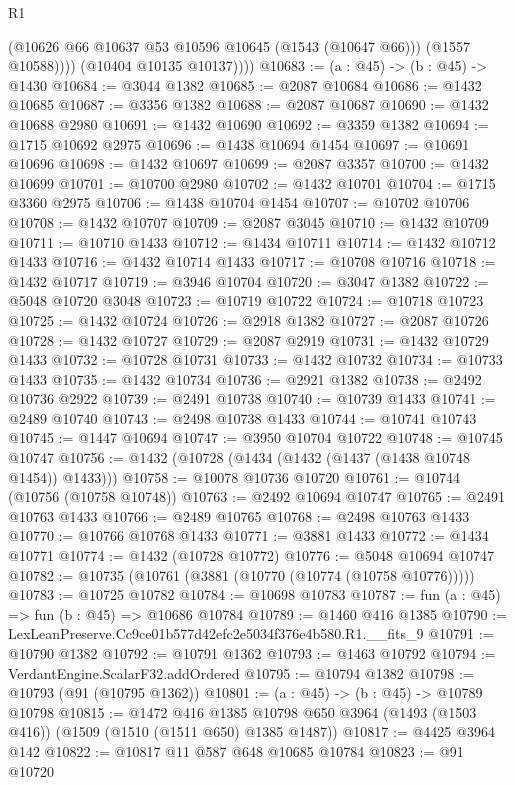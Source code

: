 \begin{lexlean}{R1}
\begin{coremodule}
                (@10626 @66 @10637 @53 @10596 @10645 (@1543 (@10647 @66)))
                (@1557 @10588))))
          (@10404 @10135 @10137))))
@10683 := (a : @45) -> (b : @45) -> @1430
@10684 := @3044 @1382
@10685 := @2087 @10684
@10686 := @1432 @10685
@10687 := @3356 @1382
@10688 := @2087 @10687
@10690 := @1432 @10688 @2980
@10691 := @1432 @10690
@10692 := @3359 @1382
@10694 := @1715 @10692 @2975
@10696 := @1438 @10694 @1454
@10697 := @10691 @10696
@10698 := @1432 @10697
@10699 := @2087 @3357
@10700 := @1432 @10699
@10701 := @10700 @2980
@10702 := @1432 @10701
@10704 := @1715 @3360 @2975
@10706 := @1438 @10704 @1454
@10707 := @10702 @10706
@10708 := @1432 @10707
@10709 := @2087 @3045
@10710 := @1432 @10709
@10711 := @10710 @1433
@10712 := @1434 @10711
@10714 := @1432 @10712 @1433
@10716 := @1432 @10714 @1433
@10717 := @10708 @10716
@10718 := @1432 @10717
@10719 := @3946 @10704
@10720 := @3047 @1382
@10722 := @5048 @10720 @3048
@10723 := @10719 @10722
@10724 := @10718 @10723
@10725 := @1432 @10724
@10726 := @2918 @1382
@10727 := @2087 @10726
@10728 := @1432 @10727
@10729 := @2087 @2919
@10731 := @1432 @10729 @1433
@10732 := @10728 @10731
@10733 := @1432 @10732
@10734 := @10733 @1433
@10735 := @1432 @10734
@10736 := @2921 @1382
@10738 := @2492 @10736 @2922
@10739 := @2491 @10738
@10740 := @10739 @1433
@10741 := @2489 @10740
@10743 := @2498 @10738 @1433
@10744 := @10741 @10743
@10745 := @1447 @10694
@10747 := @3950 @10704 @10722
@10748 := @10745 @10747
@10756 := @1432 (@10728 (@1434 (@1432 (@1437 (@1438 @10748 @1454)) @1433)))
@10758 := @10078 @10736 @10720
@10761 := @10744 (@10756 (@10758 @10748))
@10763 := @2492 @10694 @10747
@10765 := @2491 @10763 @1433
@10766 := @2489 @10765
@10768 := @2498 @10763 @1433
@10770 := @10766 @10768 @1433
@10771 := @3881 @1433
@10772 := @1434 @10771
@10774 := @1432 (@10728 @10772)
@10776 := @5048 @10694 @10747
@10782 := @10735 (@10761 (@3881 (@10770 (@10774 (@10758 @10776)))))
@10783 := @10725 @10782
@10784 := @10698 @10783
@10787 := fun (a : @45) => fun (b : @45) => @10686 @10784
@10789 := @1460 @416 @1385
@10790 := LexLeanPreserve.Cc9ce01b577d42efc2e5034f376e4b580.R1.__fits_9
@10791 := @10790 @1382
@10792 := @10791 @1362
@10793 := @1463 @10792
@10794 := VerdantEngine.ScalarF32.addOrdered
@10795 := @10794 @1382
@10798 := @10793 (@91 (@10795 @1362))
@10801 := (a : @45) -> (b : @45) -> @10789 @10798
@10815 := @1472
    @416
    @1385
    @10798
    @650
    @3964
    (@1493 (@1503 @416))
    (@1509 (@1510 (@1511 @650) @1385 @1487))
@10817 := @4425 @3964 @142
@10822 := @10817 @11 @587 @648 @10685 @10784
@10823 := @91 @10720

\end{coremodule}
\end{lexlean}
